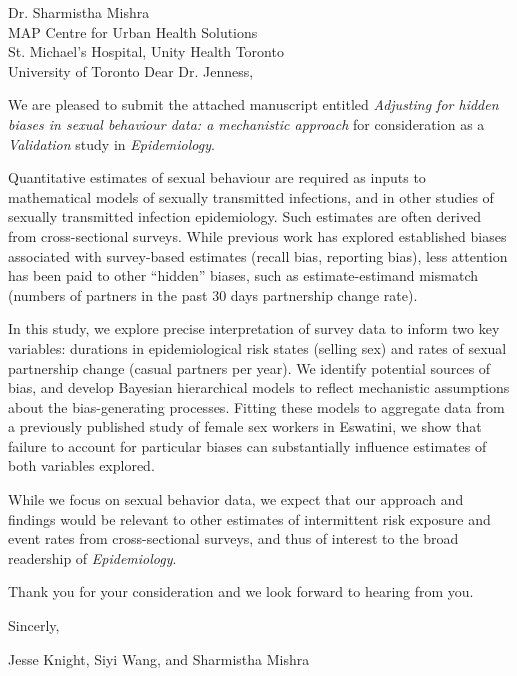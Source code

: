 \address{
  Dr. Samuel Jenness\\
  Editor\\
  Epidemiology
}{Dr. Sharmistha Mishra\\
  MAP Centre for Urban Health Solutions\\
  St. Michael's Hospital, Unity Health Toronto\\
  University of Toronto}
Dear Dr. Jenness,
\par
We are pleased to submit the attached manuscript entitled
\emph{Adjusting for hidden biases in sexual behaviour data: a mechanistic approach}
for consideration as a \emph{Validation} study in \emph{Epidemiology}.
\par
Quantitative estimates of sexual behaviour are required
as inputs to mathematical models of sexually transmitted infections,
and in other studies of sexually transmitted infection epidemiology.
Such estimates are often derived from cross-sectional surveys.
While previous work has explored established biases associated with survey-based estimates
(\eg recall bias, reporting bias),
less attention has been paid to other ``hidden'' biases, such as estimate-estimand mismatch
(\eg numbers of partners in the past 30 days \vs partnership change rate).
\par
In this study, we explore precise interpretation of survey data to inform two key variables:
durations in epidemiological risk states (\eg selling sex) and
rates of sexual partnership change (\eg casual partners per year).
We identify potential sources of bias,
and develop Bayesian hierarchical models to reflect
mechanistic assumptions about the bias-generating processes.
Fitting these models to aggregate data from
a previously published study of female sex workers in Eswatini,
we show that failure to account for particular biases can
substantially influence estimates of both variables explored.
\par
While we focus on sexual behavior data,
we expect that our approach and findings would be relevant to
other estimates of intermittent risk exposure and event rates from cross-sectional surveys,
and thus of interest to the broad readership of \emph{Epidemiology}.
\par
Thank you for your consideration and we look forward to hearing from you.
\medskip\par
Sincerly,
\par
Jesse Knight, Siyi Wang, and Sharmistha Mishra
